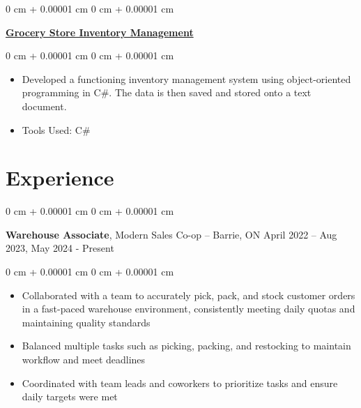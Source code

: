 \documentclass[10pt, letterpaper]{article}
\newenvironment{highlights}{
    \begin{itemize}[
        topsep=0.10 cm,
        parsep=0.10 cm,
        partopsep=0pt,
        itemsep=0pt,
        leftmargin=0 cm + 10pt
    ]
}{
    \end{itemize}
} %
\newenvironment{onecolentry}{
    \begin{adjustwidth}{
        0 cm + 0.00001 cm
    }{
        0 cm + 0.00001 cm
    }
}{
    \end{adjustwidth}
} %
\newenvironment{twocolentry}[2][]{
    \onecolentry
    \def\secondColumn{#2}
    \setcolumnwidth{\fill, 4.5 cm}
    \begin{paracol}{2}
}{
    \switchcolumn \raggedleft \secondColumn
    \end{paracol}
    \endonecolentry
} %
\begin{document}
        \vspace{0.2 cm}

        
        \begin{onecolentry}
                    \href{https://github.com/Wasaidoun/Grocery-Inventory-Management-System}{\textbf{Grocery Store Inventory Management} \faGithub}
        \end{onecolentry}
        \vspace{0.10 cm}
        \begin{onecolentry}
            \begin{highlights}
                \item Developed a functioning inventory management system using object-oriented programming in C\#. The data is then saved and stored onto a text document.
                \item Tools Used: C\# \end{highlights} \end{onecolentry}
 
    
    \section{Experience}

        \begin{twocolentry}{
            April 2022 – Aug 2023, May 2024 - Present
        }
            \textbf{Warehouse Associate}, Modern Sales Co-op -- Barrie, ON\end{twocolentry}

        \vspace{0.10 cm}
        \begin{onecolentry}
            \begin{highlights}
                \item Collaborated with a team to accurately pick, pack, and stock customer orders in a fast-paced warehouse environment, consistently meeting daily quotas and maintaining quality standards
                \item Balanced multiple tasks such as picking, packing, and restocking to maintain workflow and meet deadlines

                \item Coordinated with team leads and coworkers to prioritize tasks and ensure daily targets were met

            \end{highlights}
        \end{onecolentry}
\end{document}

